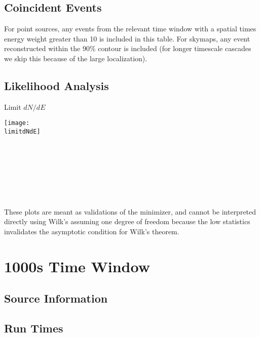 \documentclass[titlepage]{article}
\begin{document}
\subsection{Coincident Events}
For point sources, any events from the relevant time window with a spatial times energy weight greater than 10 is included in this table. For skymaps, any event reconstructed within the 90\% contour is included (for longer timescale cascades we skip this because of the large localization).
\event

\subsection{Likelihood Analysis}
\results
\pagebreak

\backgroundpdfplot

\survivialfunctionplot

\pagebreak
{
  \centering

  {\Large Limit $dN/dE$}

  \texttt{[image: \\limitdNdE]}
  \\
  \\

  \tsd

  \\
  \\
  \upperlim

  \\
  \\
  \nsscan

  These plots are meant as validations of the minimizer, and cannot be interpreted directly using Wilk's assuming one degree of freedom because the low statistics invalidates the asymptotic condition for Wilk's theorem.
}

\vfill

\pagebreak
\section{1000s Time Window}

\subsection{Source Information}
\sourcetable

\subsection{Run Times}
\runtimetable
\end{document}
